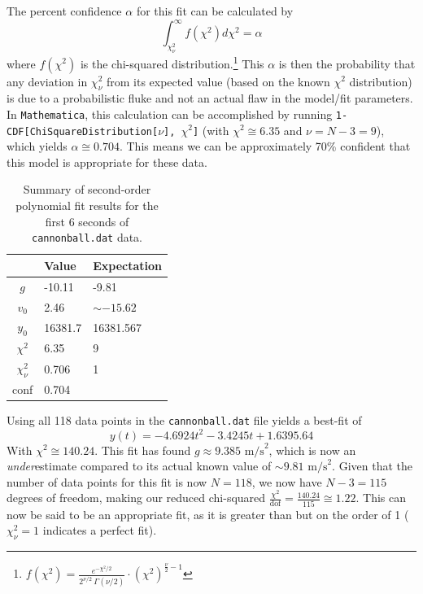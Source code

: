 \documentclass{article}
\begin{document}
The percent confidence $\alpha$ for this fit can be calculated by \begin{equation*}
    \int_{\chi_\nu^2}^\infty f(\chi^2) d\chi^2 = \alpha
\end{equation*} where $f(\chi^2)$ is the chi-squared distribution.\footnote{$\displaystyle f(\chi^2) = \frac{e^{-\chi^2/2}}{2^{\nu/2}\ \Gamma(\nu/2)}\cdot\left(\chi^2\right)^{\frac{\nu}{2}-1}$} This $\alpha$ is then the probability that any deviation in $\chi_\nu^2$ from its expected value (based on the known $\chi^2$ distribution) is due to a probabilistic fluke and not an actual flaw in the model/fit parameters. In \texttt{Mathematica}, this calculation can be accomplished by running \verb|1-CDF[ChiSquareDistribution[|$\nu$\verb|], |$\chi^2$\verb|]| (with $\chi^2 \cong 6.35$ and $\nu=N-3=9$), which yields $\alpha\cong0.704$. This means we can be approximately 70\% confident that this model is appropriate for these data.

\begin{table}[H]
    \centering
    \begin{tabular}{c|l|l}
         & Value & Expectation \\
        \hline
        $g$ & -10.11 & -9.81 \\
        $v_0$ & 2.46 & $\sim-15.62$ \\
        $y_0$ & 16381.7 & 16381.567 \\
        $\chi^2$ & 6.35 & 9 \\
        $\chi_\nu^2$ & 0.706 & 1 \\
        conf & 0.704 &
    \end{tabular}
    \caption{Summary of second-order polynomial fit results for the first 6 seconds of \texttt{cannonball.dat} data.}
    \label{tab:fit1}
\end{table}

\bigskip
{}
\medskip

Using all 118 data points in the \texttt{cannonball.dat} file yields a best-fit of \begin{equation*}
    y(t) = -4.6924t^2 - 3.4245t + 1.6395.64
\end{equation*}
With $\chi^2 \cong 140.24$. This fit has found $g\approx9.385\text{ m/s}^2$, which is now an \emph{under}estimate compared to its actual known value of $\sim9.81\text{ m/s}^2$. Given that the number of data points for this fit is now $N=118$, we now have $N-3=115$ degrees of freedom, making our reduced chi-squared $\frac{\chi^2}{\text{dof}} = \frac{140.24}{115} \cong 1.22$. This can now be said to be an appropriate fit, as it is greater than but on the order of 1 ($\chi_\nu^2 = 1$ indicates a perfect fit).
\end{document}
